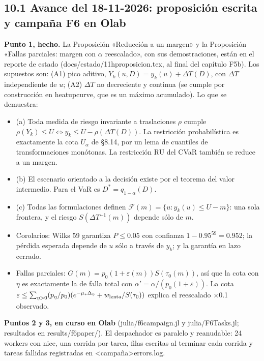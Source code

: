 \documentclass[11pt,a4paper]{article}
\newcommand{\codeus}{\textunderscore\allowbreak}
\newcommand{\code}[1]{{\small\ttfamily\let\_\codeus #1}}
\begin{document}
\subsection*{10.1 Avance del 18-11-2026: proposición escrita y campaña F6 en Olab}
\textbf{Punto 1, hecho.} La Proposición «Reducción a un margen» y la Proposición «Fallas parciales: margen con $\alpha$ reescalado», con sus demostraciones, están en el reporte de estado (\code{docs/estado/11h\_proposicion.tex}, al final del capítulo F5b). Los supuestos son: (A1) pico aditivo, $Y_k(u,D)=y_k(u)+\Delta T(D)$, con $\Delta T$ independiente de $u$; (A2) $\Delta T$ no decreciente y continua (se cumple por construcción en \code{heatup\_curve}, que es un máximo acumulado). Lo que se demuestra:

\begin{itemize}
\item (a) Toda medida de riesgo invariante a traslaciones $\rho$ cumple $\rho(Y_k)\le U\iff y_k\le U-\rho(\Delta T(D))$. La restricción probabilística es exactamente la cota $U_\alpha$ de \S{}8.14, por un lema de cuantiles de transformaciones monótonas. La restricción RU del CVaR también se reduce a un margen.
\item (b) El escenario orientado a la decisión existe por el teorema del valor intermedio. Para el VaR es $D^*=q_{1-\alpha}(D)$.
\item (c) Todas las formulaciones definen $\mathcal F(m)=\{u: y_k(u)\le U-m\}$: una sola frontera, y el riesgo $S(\Delta T^{-1}(m))$ depende sólo de $m$.
\item Corolarios: Wilks 59 garantiza $P\le0.05$ con confianza $1-0.95^{59}=0.952$; la pérdida esperada depende de $u$ sólo a través de $y_k$; y la garantía en lazo cerrado.
\item Fallas parciales: $G(m)=p_0(1+\varepsilon(m))S(\tau_0(m))$, así que la cota con $\eta$ es exactamente la de falla total con $\alpha'=\alpha/(p_0(1+\varepsilon))$. La cota $\varepsilon\le\sum_{\eta>0}(p_\eta/p_0)(e^{-\mu_*\Delta_\eta}+w_{\rm lenta}/S(\tau_0))$ explica el reescalado $\times$0.1 observado.
\end{itemize}

\textbf{Puntos 2 y 3, en curso en Olab} (\code{julia/f6\_campaign.jl} y \code{julia/F6Tasks.jl}; resultados en \code{results/f6\_paper/}). El despachador es paralelo y reanudable: 24 workers con \code{nice}, una corrida por tarea, filas escritas al terminar cada corrida y tareas fallidas registradas en \code{<campaña>\_errors.log}.
\end{document}
